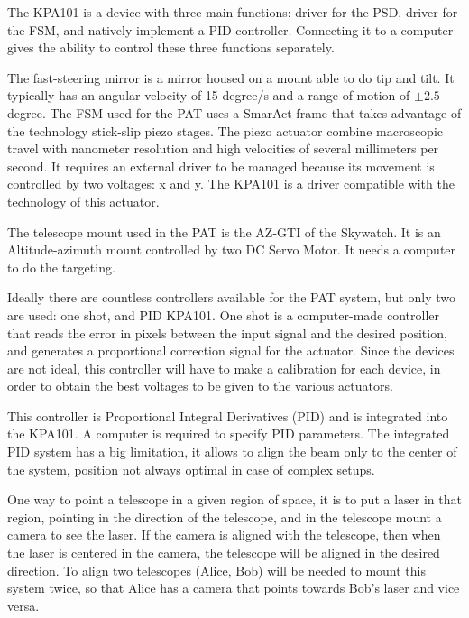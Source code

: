 The KPA101 is a device with three main functions: driver for the PSD, driver for the FSM, and natively implement a PID controller. Connecting it to a computer gives the ability to control these three functions separately.


The fast-steering mirror is a mirror housed on a mount able to do tip and tilt. It typically has an angular velocity of 15 degree/s and a range of motion of $\pm 2.5$ degree.
The FSM used for the PAT uses a SmarAct frame that takes advantage of the technology stick-slip piezo stages. The piezo actuator combine macroscopic travel with nanometer resolution and high velocities of several millimeters per second.
It requires an external driver to be managed because its movement is controlled by two voltages: x and y. The KPA101 is a driver compatible with the technology of this actuator.

The telescope mount used in the PAT is the AZ-GTI of the Skywatch. It is an Altitude-azimuth mount controlled by two DC Servo Motor. It needs a computer to do the targeting.

Ideally there are countless controllers available for the PAT system, but only two are used: one shot, and PID KPA101.
One shot is a computer-made controller that reads the error in pixels between the input signal and the desired position, and generates a proportional correction signal for the actuator.
Since the devices are not ideal, this controller will have to make a calibration for each device, in order to obtain the best voltages to be given to the various actuators.

This controller is Proportional Integral Derivatives (PID) and is integrated into the KPA101. A computer is required to specify PID parameters. The integrated PID system has a big limitation, it allows to align the beam only to the center of the system, position not always optimal in case of complex setups.

One way to point a telescope in a given region of space, it is to put a laser in that region, pointing in the direction of the telescope, and in the telescope mount a camera to see the laser.
If the camera is aligned with the telescope, then when the laser is centered in the camera, the telescope will be aligned in the desired direction.
To align two telescopes (Alice, Bob) will be needed to mount this system twice, so that Alice has a camera that points towards Bob’s laser and vice versa.

